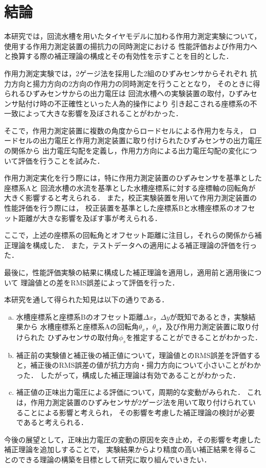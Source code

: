 \section{結論}
本研究では，回流水槽を用いたタイヤモデルに加わる作用力測定実験について，
使用する作用力測定装置の揚抗力の同時測定における
性能評価および作用力へと換算する際の補正理論の構成とその有効性を示すことを目的とした．

作用力測定実験では，2ゲージ法を採用した2組のひずみセンサからそれぞれ
抗力方向と揚力方向の2方向の作用力の同時測定を行うこととなり，
そのときに得られるひずみセンサからの出力電圧は
回流水槽への実験装置の取付，ひずみセンサ貼付け時の不正確性といった人為的操作により
引き起こされる座標系の不一致によって大きな影響を及ぼされることがわかった．

そこで，作用力測定装置に複数の角度からロードセルによる作用力を与え，
ロードセルの出力電圧と作用力測定装置に取り付けられたひずみセンサの出力電圧の関係から
出力電圧勾配を定義し，作用力方向による出力電圧勾配の変化について評価を行うことを試みた．

作用力測定実化を行う際には，特に作用力測定装置のひずみセンサを基準とした座標系Aと
回流水槽の水流を基準とした水槽座標系に対する座標軸の回転角が大きく影響すると考えられる．
また，校正実験装置を用いて作用力測定装置の性能評価を行う際には，
校正装置を基準とした座標系Bと水槽座標系のオフセット距離が大きな影響を及ぼす事が考えられる．

ここで，上述の座標系の回転角とオフセット距離に注目し，それらの関係から補正理論を構成した．
また，テストデータへの適用による補正理論の評価を行った．

最後に，性能評価実験の結果に構成した補正理論を適用し，適用前と適用後について
理論値との差をRMS誤差によって評価を行った．

本研究を通して得られた知見は以下の通りである．

\begin{enumerate}[(a)]
    \item   水槽座標系と座標系Bのオフセット距離$\Delta x$，$\Delta y$が既知であるとき，実験結果から
            水槽座標系と座標系Aの回転角$\theta_x$，$\theta_y$，及び作用力測定装置に取り付けられた
            ひずみセンサの取付角$\phi_s$を推定することができることがわかった．\\
    \item   補正前の実験値と補正後の補正値について，理論値とのRMS誤差を評価すると，補正後のRMS誤差の値が抗力方向・揚力方向について小さいことがわかった．
            したがって，構成した補正理論は有効であることがわかった．\\
    \item   補正値の正味出力電圧による評価について，周期的な変動がみられた．
            これは，作用力測定装置のひずみセンサが2ゲージ法を用いて取り付けられていることによる影響と考えられ，
            その影響を考慮した補正理論の検討が必要であると考えられる．
\end{enumerate}

今後の展望として，正味出力電圧の変動の原因を突き止め，その影響を考慮した補正理論を追加しすることで，
実験結果からより精度の高い補正結果を得ることのできる理論の構築を目標として研究に取り組んでいきたい．
